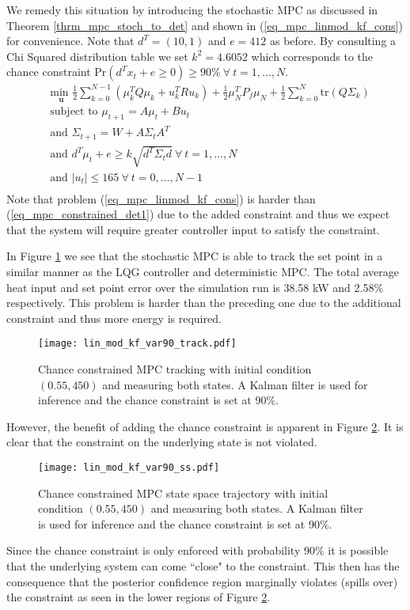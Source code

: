 We remedy this situation by introducing the stochastic MPC as discussed in Theorem \ref{thrm_mpc_stoch_to_det} and shown in (\ref{eq_mpc_linmod_kf_cons}) for convenience. Note that $d^T = (10, 1)$ and $e=412$ as before. By consulting a Chi Squared distribution table we set $k^2 = 4.6052$ which corresponds to the chance constraint $\text{Pr}(d^Tx_t + e \geq 0) \geq 90\% ~\forall ~t=1,...,N$.
\begin{equation}
\begin{aligned}
&\underset{\mathbf{u}}{\text{min }} \frac{1}{2}\sum_{k=0}^{N-1} \left( \mu_k^TQ\mu_k + u_k^TRu_k \right) + \frac{1}{2}\mu_N^TP_f\mu_N + \frac{1}{2}\sum_{k=0}^N \text{tr}(Q\Sigma_k) \\
& \text{subject to } \mu_{t+1}=A\mu_t + Bu_t \\
& \text{and } \Sigma_{t+1} = W+A\Sigma_t A^T \\
& \text{and } d^T\mu_t + e \geq k\sqrt{d^T \Sigma_t d} ~\forall ~t=1,...,N\\
& \text{and } |u_t| \leq 165 ~\forall ~t=0,...,N-1\\
\end{aligned}
\label{eq_mpc_linmod_kf_cons}
\end{equation}
Note that problem (\ref{eq_mpc_linmod_kf_cons}) is harder than (\ref{eq_mpc_constrained_det1}) due to the added constraint and thus we expect that the system will require greater controller input to satisfy the constraint. 

In Figure \ref{fig_lin_mod_kf_var90_track} we see that the stochastic MPC is able to track the set point in a similar manner as the LQG controller and deterministic MPC. The total average heat input and set point error over the simulation run is  38.58 kW and 2.58\% respectively. This problem is harder than the preceding one due to the additional constraint and thus more energy is required. 
\begin{figure}[H] 
\centering
\texttt{[image: lin\_mod\_kf\_var90\_track.pdf]}
\caption{Chance constrained MPC tracking with initial condition $(0.55, 450)$ and measuring both states. A Kalman filter is used for inference and the chance constraint is set at 90\%.}
\label{fig_lin_mod_kf_var90_track}
\end{figure}
However, the benefit of adding the chance constraint is apparent in Figure \ref{fig_lin_mod_kf_var90_ss}. It is clear that the constraint on the underlying state is not violated.
\begin{figure}[H] 
\centering
\texttt{[image: lin\_mod\_kf\_var90\_ss.pdf]}
\caption{Chance constrained MPC state space trajectory with initial condition $(0.55, 450)$ and measuring both states. A Kalman filter is used for inference and the chance constraint is set at 90\%.}
\label{fig_lin_mod_kf_var90_ss}
\end{figure}
Since the chance constraint is only enforced with probability 90\% it is possible that the underlying system can come ``close" to the constraint. This then has the consequence that the posterior confidence region marginally violates (spills over) the constraint as seen in the lower regions of Figure \ref{fig_lin_mod_kf_var90_ss}.
 
